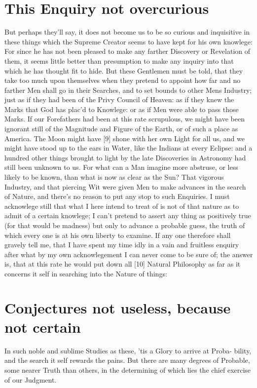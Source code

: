 \documentclass[letterpaper]{book}
\begin{document}
\section{This Enquiry not overcurious}

But perhaps they'll say, it does not become us to be so curious and
inquisitive in these things which the Supreme Creator seems to have kept for
his own knowlege: For since he has not been pleased to make any farther
Discovery or Revelation of them, it seems little better than presumption to
make any inquiry into that which he has thought fit to hide. But these
Gentlemen must be told, that they take too much upon themselves when they
pretend to appoint how far and no farther Men shall go in their Searches,
and to set bounds to other Mens Industry; just as if they had been of the
Privy Council of Heaven: as if they knew the Marks that God has plac'd to
Knowlege: or as if Men were able to pass those Marks. If our Forefathers had
been at this rate scrupulous, we might have been ignorant still of the
Magnitude and Figure of the Earth, or of such a place as America. The Moon
might have [9] shone with her own Light for all us, and we might have stood
up to the ears in Water, like the Indians at every Eclipse: and a hundred
other things brought to light by the late Discoveries in Astronomy had still
been unknown to us. For what can a Man imagine more abstruse, or less likely
to be known, than what is now as clear as the Sun? That vigorous Industry,
and that piercing Wit were given Men to make advances in the search of
Nature, and there's no reason to put any stop to such Enquiries. I must
acknowlege still that what I here intend to treat of is not of that nature
as to admit of a certain knowlege; I can't pretend to assert any thing as
positively true (for that would be madness) but only to advance a probable
guess, the truth of which every one is at his own liberty to examine. If any
one therefore shall gravely tell me, that I have spent my time idly in a
vain and fruitless enquiry after what by my own acknowlegement I can never
come to be sure of; the answer is, that at this rate he would put down all
[10] Natural Philosophy as far as it concerns it self in searching into the
Nature of things:


\section{Conjectures not useless, because not certain}

In such noble and sublime Studies as these, 'tis a Glory to arrive at Proba-
bility, and the search it self rewards the pains. But there are many degrees
of Probable, some nearer Truth than others, in the determining of which lies
the chief exercise of our Judgment.
\end{document}
